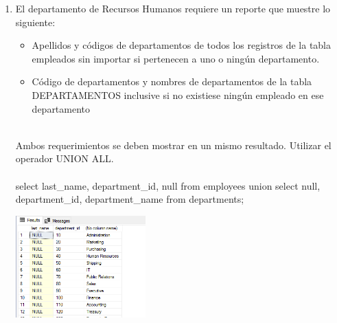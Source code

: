 \begin{enumerate}[1.]
	\item El departamento de Recursos Humanos requiere un reporte que muestre lo siguiente:

	\begin{itemize}
		\item Apellidos y c\'odigos de departamentos de todos los registros de la tabla empleados sin importar si pertenecen a uno o ningún departamento.
		\item C\'odigo de departamentos y nombres de departamentos de la tabla DEPARTAMENTOS inclusive si no existiese ningún empleado en ese departamento
	\end{itemize}
	\\Ambos requerimientos se deben mostrar en un mismo resultado. Utilizar el operador UNION ALL.
	\\
	\\select last\_name, department\_id, null from employees union select null, department\_id, department\_name from departments;

	\begin{center}
	\includegraphics[width=5cm]{./Imagenes/ejercicio10-5} 
	\end{center}

\end{enumerate}